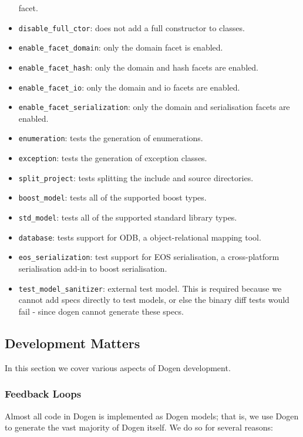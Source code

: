 \documentclass[11pt]{article}
\begin{document}
\begin{itemize}
facet.
\item \texttt{disable\_full\_ctor}: does not add a full constructor to classes.
\item \texttt{enable\_facet\_domain}: only the domain facet is enabled.
\item \texttt{enable\_facet\_hash}: only the domain and hash facets are enabled.
\item \texttt{enable\_facet\_io}: only the domain and io facets are enabled.
\item \texttt{enable\_facet\_serialization}: only the domain and serialisation
facets are enabled.
\item \texttt{enumeration}: tests the generation of enumerations.
\item \texttt{exception}: tests the generation of exception classes.
\item \texttt{split\_project}: tests splitting the include and source directories.
\item \texttt{boost\_model}: tests all of the supported boost types.
\item \texttt{std\_model}: tests all of the supported standard library types.
\item \texttt{database}: tests support for ODB, a object-relational mapping tool.
\item \texttt{eos\_serialization}: test support for EOS serialisation, a
cross-platform serialisation add-in to boost serialisation.
\item \texttt{test\_model\_sanitizer}: external test model. This is required
because we cannot add specs directly to test models, or else the
binary diff tests would fail - since dogen cannot generate these
specs.
\end{itemize}

\subsection{Development Matters}
\label{sec-2-3}

In this section we cover various aspects of Dogen development.

\subsubsection{Feedback Loops}
\label{sec-2-3-1}

Almost all code in Dogen is implemented as Dogen models; that is, we
use Dogen to generate the vast majority of Dogen itself. We do so for
several reasons:
\end{document}
